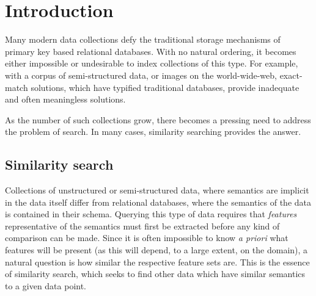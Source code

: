 \chapter{Introduction}\label{ch:introduction}
%
Many modern data collections defy the traditional storage mechanisms of primary key based relational databases. With no natural ordering, it becomes either impossible or undesirable to index collections of this type.  For example, with a corpus of semi-structured data, or images on the world-wide-web, exact-match solutions, which have typified traditional databases, provide inadequate and often meaningless solutions.

As the number of such collections grow, there becomes a pressing need to address the problem of search.  In many cases, similarity searching provides the answer. 

 \section{Similarity search}
Collections of unstructured or semi-structured data, where semantics are implicit in the data itself differ from relational databases, where the semantics of the data is contained in their schema.  Querying this type of data requires that \textit{features} representative of the semantics must first be extracted before any kind of comparison can be made.  Since it is often impossible to know \textit{a priori} what features will be present (as this will depend, to a large extent, on the domain), a natural question is how similar the respective feature sets are.  This is the essence of similarity search, which seeks to find other data which have similar semantics to a given data point.

